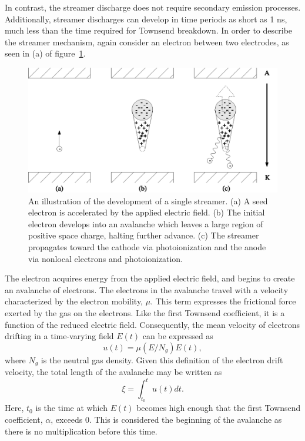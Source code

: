 In contrast, the streamer discharge does not require secondary emission
processes. Additionally, streamer discharges can develop in time periods as
short as 1 ns, much less than the time required for Townsend breakdown. In order
to describe the streamer mechanism, again consider an electron between two
electrodes, as seen in (a) of figure~\ref{fig:streamer}.
\begin{figure}
  \centering
  \includegraphics{./chapters/theory/figures/streamer.eps}
  \caption{An illustration of the development of a single streamer. (a)
    A seed electron is accelerated by the applied electric field. (b) The
    initial electron develops into an avalanche which leaves a large region
    of positive space charge, halting further advance. (c) The streamer
    propagates toward the cathode via photoionization and the anode via
    nonlocal electrons and photoionization.}
  \label{fig:streamer}
\end{figure}
The electron acquires energy from the applied electric field, and begins to
create an avalanche of electrons. The electrons in the avalanche travel with a
velocity characterized by the electron mobility, $\mu$. This term expresses the
frictional force exerted by the gas on the electrons. Like the first Townsend
coefficient, it is a function of the reduced electric field. Consequently, the
mean velocity of electrons drifting in a time-varying field $E(t)$ can be
expressed as
\begin{equation}
  u(t) = \mu(E/N_g) E(t),
\end{equation}
where $N_g$ is the neutral gas density. Given this definition of the electron
drift velocity, the total length of the avalanche may be written as
\begin{equation}
  \xi = \int_{t_0}^t u(t) dt.
  \label{eq:s_xi}
\end{equation}
Here, $t_0$ is the time at which $E(t)$ becomes high enough that the first
Townsend coefficient, $\alpha$, exceeds 0. This is considered the beginning of
the avalanche as there is no multiplication before this time.

